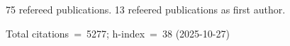 75 refereed publications. 13 refeered publications as first author.

Total citations~=~5277; h-index~=~38 (2025-10-27)